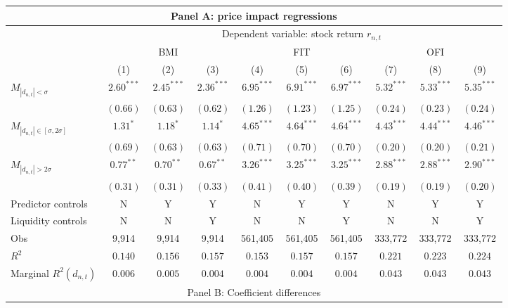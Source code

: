 \begin{tabular}{lccccccccc}
  \hline \multicolumn{10}{c}{Panel A: price impact regressions} \\
 \hline 
                                    & \multicolumn{9}{c}{Dependent variable: stock return $r_{n,t}$} \\

                                    \cmidrule(l){2-10} & \multicolumn{3}{c}{BMI} & \multicolumn{3}{c}{FIT} & \multicolumn{3}{c}{OFI} \\
 \cmidrule(l){2-4} \cmidrule(l){5-7} \cmidrule(l){8-10} 
  & (1) & (2) & (3) & (4) & (5) & (6) & (7) & (8) & (9) \\ 
  $M_{|d_{n,t}| < \sigma}$ & $2.60^{***}$ & $2.45^{***}$ & $2.36^{***}$ & $6.95^{***}$ & $6.91^{***}$ & $6.97^{***}$ & $5.32^{***}$ & $5.33^{***}$ & $5.35^{***}$ \\ 
   & $(0.66)$ & $(0.63)$ & $(0.62)$ & $(1.26)$ & $(1.23)$ & $(1.25)$ & $(0.24)$ & $(0.23)$ & $(0.24)$ \\ 
  $M_{|d_{n,t}| \in [\sigma, 2\sigma]}$ & $1.31^{*}$ & $1.18^{*}$ & $1.14^{*}$ & $4.65^{***}$ & $4.64^{***}$ & $4.64^{***}$ & $4.43^{***}$ & $4.44^{***}$ & $4.46^{***}$ \\ 
   & $(0.69)$ & $(0.63)$ & $(0.63)$ & $(0.71)$ & $(0.70)$ & $(0.70)$ & $(0.20)$ & $(0.20)$ & $(0.21)$ \\ 
  $M_{|d_{n,t}| > 2 \sigma}$ & $0.77^{**}$ & $0.70^{**}$ & $0.67^{**}$ & $3.26^{***}$ & $3.25^{***}$ & $3.25^{***}$ & $2.88^{***}$ & $2.88^{***}$ & $2.90^{***}$ \\ 
   \vspace{5pt} & $(0.31)$ & $(0.31)$ & $(0.33)$ & $(0.41)$ & $(0.40)$ & $(0.39)$ & $(0.19)$ & $(0.19)$ & $(0.20)$ \\ 
  Predictor controls & N & Y & Y & N & Y & Y & N & Y & Y \\ 
   \vspace{5pt}Liquidity controls & N & N & Y & N & N & Y & N & N & Y \\ 
  Obs & 9,914 & 9,914 & 9,914 & 561,405 & 561,405 & 561,405 & 333,772 & 333,772 & 333,772 \\ 
  $R^2$ & $0.140$ & $0.156$ & $0.157$ & $0.153$ & $0.157$ & $0.157$ & $0.221$ & $0.223$ & $0.224$ \\ 
  Marginal $R^2(d_{n,t})$ & $0.006$ & $0.005$ & $0.004$ & $0.004$ & $0.004$ & $0.004$ & $0.043$ & $0.043$ & $0.043$ \\ 
   \hline \multicolumn{10}{c}{Panel B: Coefficient differences} \\

\end{tabular}
